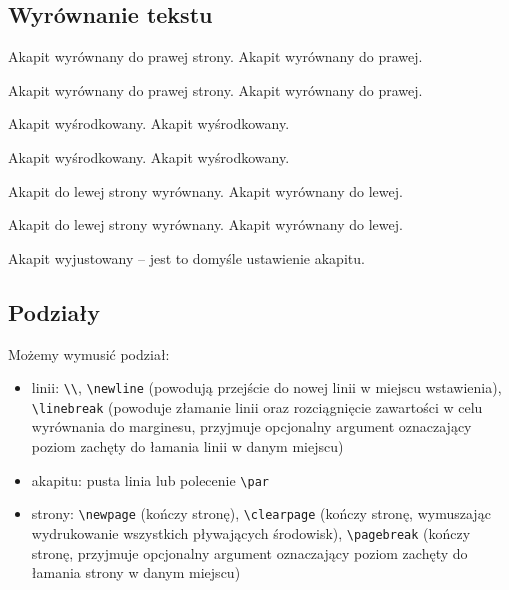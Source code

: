 \documentclass[fontSize=10pt,extra]{pdfArticle}
\begin{document}
\subsection{Wyrównanie tekstu}

\begin{Example}
\begin{flushright}
Akapit wyrównany do prawej strony. Akapit wyrównany do prawej.
\end{flushright}
\begin{FlushRight}
Akapit wyrównany do prawej strony. Akapit wyrównany do prawej.
\end{FlushRight}
\end{Example}

\begin{Example}
\begin{center}
Akapit wyśrodkowany. Akapit wyśrodkowany.
\end{center}
\begin{Center}
Akapit wyśrodkowany. Akapit wyśrodkowany.
\end{Center}
\end{Example}

\begin{Example}
\begin{flushleft}
Akapit do lewej strony wyrównany. Akapit wyrównany do lewej.
\end{flushleft}
\begin{FlushLeft}
Akapit do lewej strony wyrównany. Akapit wyrównany do lewej.
\end{FlushLeft}
\end{Example}

\begin{Example}
\begin{justify}
Akapit wyjustowany – jest to domyśle ustawienie akapitu.
\end{justify}
\end{Example}

\subsection{Podziały}

Możemy wymusić podział:
\vspace{-\parskip}\begin{itemize}
\item linii: \Verb$\\$, \Verb$\newline$ (powodują przejście do nowej linii w miejscu wstawienia), \Verb$\linebreak$ (powoduje złamanie linii oraz rozciągnięcie zawartości w celu wyrównania do marginesu, przyjmuje opcjonalny argument oznaczający poziom zachęty do łamania linii w danym miejscu)
\item akapitu: pusta linia lub polecenie \Verb$\par$
\item strony: \Verb$\newpage$ (kończy stronę), \Verb$\clearpage$ (kończy stronę, wymuszając wydrukowanie wszystkich pływających środowisk), \Verb$\pagebreak$ (kończy stronę, przyjmuje opcjonalny argument oznaczający poziom zachęty do łamania strony w danym miejscu)
\end{itemize}
\end{document}
